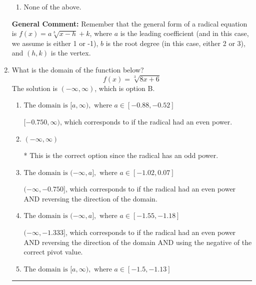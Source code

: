 \documentclass{extbook}[14pt]
\newcommand{\litem}[1]{\item #1

\rule{\textwidth}{0.4pt}}
\begin{document}
\begin{enumerate}
{\begin{enumerate}[label=\Alph*.]
\item None of the above.\end{enumerate}
\textbf{General Comment:} Remember that the general form of a radical equation is $ f(x) = a \sqrt[b]{x - h} + k $, where $a$ is the leading coefficient (and in this case, we assume is either 1 or -1), $b$ is the root degree (in this case, either 2 or 3), and $(h, k)$ is the vertex.
}
\litem{
What is the domain of the function below?
\[ f(x) = \sqrt[3]{8 x + 6} \]The solution is \( (-\infty, \infty) \), which is option B.\begin{enumerate}[label=\Alph*.]
\item \( \text{The domain is } [a, \infty), \text{   where } a \in [-0.88, -0.52] \)

$[-0.750, \infty)$, which corresponds to if the radical had an even power.
\item \( (-\infty, \infty) \)

* This is the correct option since the radical has an odd power.
\item \( \text{The domain is } (-\infty, a], \text{   where } a \in [-1.02, 0.07] \)

$(-\infty, -0.750]$, which corresponds to if the radical had an even power AND reversing the direction of the domain.
\item \( \text{The domain is } (-\infty, a], \text{   where } a \in [-1.55, -1.18] \)

$(-\infty, -1.333]$, which corresponds to if the radical had an even power AND reversing the direction of the domain AND using the negative of the correct pivot value.
\item \( \text{The domain is } [a, \infty), \text{   where } a \in [-1.5, -1.13] \)


\end{enumerate}}
\end{enumerate}
\end{document}
